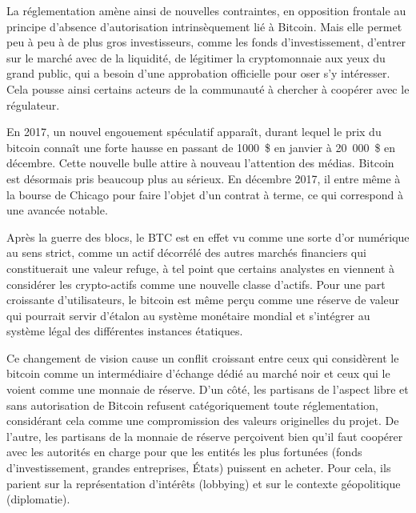 La réglementation amène ainsi de nouvelles contraintes, en opposition frontale au principe d'absence d'autorisation intrinsèquement lié à Bitcoin. Mais elle permet peu à peu à de plus gros investisseurs, comme les fonds d'investissement, d'entrer sur le marché avec de la liquidité, de légitimer la cryptomonnaie aux yeux du grand public, qui a besoin d'une approbation officielle pour oser s'y intéresser. Cela pousse ainsi certains acteurs de la communauté à chercher à coopérer avec le régulateur. %

En 2017, un nouvel engouement spéculatif apparaît, durant lequel le prix du bitcoin connaît une forte hausse en passant de 1000~\$ en janvier à 20~000~\$ en décembre. Cette nouvelle bulle attire à nouveau l'attention des médias. Bitcoin est désormais pris beaucoup plus au sérieux. En décembre 2017, il entre même à la bourse de Chicago pour faire l'objet d'un contrat à terme, ce qui correspond à une avancée notable.

Après la guerre des blocs, le BTC est en effet vu comme une sorte d'or numérique au sens strict, comme un actif décorrélé des autres marchés financiers qui constituerait une valeur refuge, à tel point que certains analystes en viennent à considérer les crypto-actifs comme une nouvelle classe d'actifs. Pour une part croissante d'utilisateurs, le bitcoin est même perçu comme une réserve de valeur qui pourrait servir d'étalon au système monétaire mondial et s'intégrer au système légal des différentes instances étatiques.

Ce changement de vision cause un conflit croissant entre ceux qui considèrent le bitcoin comme un intermédiaire d'échange dédié au marché noir et ceux qui le voient comme une monnaie de réserve. D'un côté, les partisans de l'aspect libre et sans autorisation de Bitcoin refusent catégoriquement toute réglementation, considérant cela comme une compromission des valeurs originelles du projet. De l'autre, les partisans de la monnaie de réserve perçoivent bien qu'il faut coopérer avec les autorités en charge pour que les entités les plus fortunées (fonds d'investissement, grandes entreprises, États) puissent en acheter. Pour cela, ils parient sur la représentation d'intérêts (lobbying) et sur le contexte géopolitique (diplomatie).

